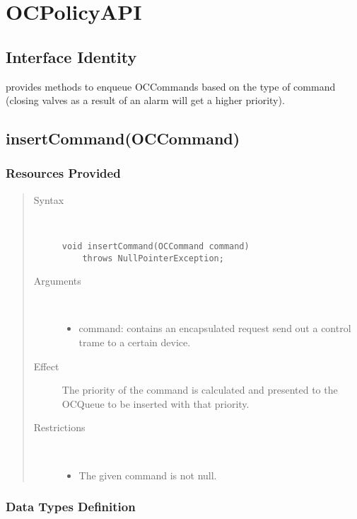 \section{OCPolicyAPI}

\subsection{Interface Identity}

\npar {} provides methods to enqueue
OCCommands based on the type of command (closing valves as a result
of an alarm will get a higher priority).

\subsection{insertCommand(OCCommand)}

\subsubsection{Resources Provided}

\begin{quote}
	\begin{description}
		\item[Syntax] \ 
		\begin{verbatim}
void insertCommand(OCCommand command) 
    throws NullPointerException;
		\end{verbatim}
		\item[Arguments] \
		\begin{itemize}
			\item command: contains an encapsulated request send out a control trame to
			a certain device.
		\end{itemize}
		\item[Effect] The priority of the command is calculated and presented to the
		OCQueue to be inserted with that priority.
		\item[Restrictions] \ 
		\begin{itemize}
			\item The given command is not null.
		\end{itemize}
	\end{description} 
\end{quote}

\subsubsection{Data Types Definition}

